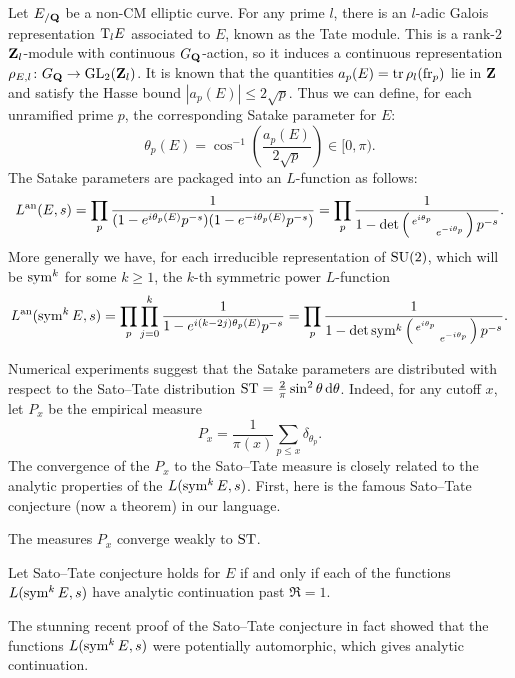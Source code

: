 Let $E_{/\mathbf{Q}}$ be a non-CM elliptic curve. For any prime $l$, there is an 
$l$-adic Galois representation $\mathrm{T}_l E$ associated to $E$, known as the 
Tate module. This is a rank-$2$ $\mathbf{Z}_l$-module with continuous $G_{\mathbf{Q}}$-action, 
so it induces a continuous representation 
$\rho_{E,l} \colon G_{\mathbf{Q}} \to \operatorname{GL}_2(\mathbf{Z}_l)$. It is known 
\cite[Th.~V.1.1]{silverman-2009} that the quantities 
$a_p(E) = \operatorname{tr} \rho_l(\mathrm{fr}_p)$ lie in $\mathbf{Z}$ and satisfy the Hasse bound 
$|a_p(E)| \leqslant 2\sqrt p$. Thus we can define, for each unramified prime 
$p$, the corresponding Satake parameter for $E$: 
\[
	\theta_p(E) = \cos^{-1}\left(\frac{a_p(E)}{2\sqrt p}\right) \in [0,\pi) .
\]
The Satake parameters are packaged into an $L$-function as follows:
\[
	L^{\mathrm{an}}(E,s) = \prod_p \frac{1}{(1 - e^{i \theta_p(E)} p^{-s})(1- e^{-i \theta_p(E)} p^{-s})} = \prod_p \frac{1}{1 - \det\left(\begin{smallmatrix} e^{i\theta_p} &  \\  & e^{-i \theta_p} \end{smallmatrix}\right)p^{-s}}.
\]
More generally we have, for each irreducible representation of $\operatorname{SU}(2)$, which 
will be $\operatorname{sym}^k$ for some $k\geqslant 1$, the $k$-th symmetric power 
$L$-function 
\[
	L^{\mathrm{an}}(\operatorname{sym}^k E, s) = \prod_p \prod_{j=0}^k \frac{1}{1 - e^{i (k - 2j) \theta_p(E)} p^{-s}} = \prod_p \frac{1}{1-\det \operatorname{sym}^k \left(\begin{smallmatrix} e^{i\theta_p} &  \\  & e^{-i \theta_p} \end{smallmatrix}\right)p^{-s}}.
\]

Numerical experiments suggest that the Satake parameters are distributed with 
respect to the Sato--Tate distribution 
$\mathrm{ST} = \frac{2}{\pi} \sin^2\theta\, \mathrm{d}\theta$. Indeed, for any cutoff $x$, let 
$P_x$ be the empirical measure 
\[
	P_x = \frac{1}{\pi(x)} \sum_{p\leqslant x} \delta_{\theta_p} .
\]
The convergence of the $P_x$ to the Sato--Tate measure is closely related to 
the analytic properties of the $L(\operatorname{sym}^k E,s)$. First, here is the famous 
Sato--Tate conjecture (now a theorem) in our language. 

\begin{theorem}
The measures $P_x$ converge weakly to $\mathrm{ST}$. 
\end{theorem}

\begin{theorem}
Let Sato--Tate conjecture holds for $E$ if and only if each of the functions 
$L(\operatorname{sym}^k E,s)$ have analytic continuation past $\Re =1$. 
\end{theorem}

The stunning recent proof of the Sato--Tate conjecture 
\cite{clozel-harris-taylor-2008,taylor-2008,harris-shepherd-barron-taylor-2010} 
in fact showed that the functions $L(\operatorname{sym}^k E,s)$ were potentially automorphic, 
which gives analytic continuation. 

